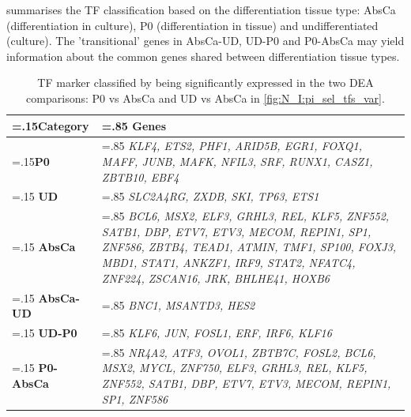  summarises the TF classification based on the differentiation tissue type: AbsCa (differentiation in culture), P0 (differentiation in tissue) and undifferentiated (culture). The 'transitional' genes in AbsCa-UD, UD-P0 and P0-AbsCa may yield information about the common genes shared between differentiation tissue types.

\begin{table}[!htb]
  \centering
  \small
  \begin{tabularx}{\textwidth}{>{\hsize=.15\hsize}X|>{\hsize=.85\hsize}X}
    \toprule
    \textbf{Category} & \textbf{Genes} \\
    \midrule
    \textbf{P0} & \textit{KLF4, ETS2, PHF1, ARID5B, EGR1, FOXQ1, MAFF, JUNB, MAFK, NFIL3, SRF, RUNX1, CASZ1, ZBTB10, EBF4} \\
    \midrule
    \textbf{UD} & \textit{SLC2A4RG, ZXDB, SKI, TP63, ETS1} \\
    \midrule
    \textbf{AbsCa} & \textit{BCL6, MSX2, ELF3, GRHL3, REL, KLF5, ZNF552, SATB1, DBP, ETV7, ETV3, MECOM, REPIN1, SP1, ZNF586, ZBTB4, TEAD1, ATMIN, TMF1, SP100, FOXJ3, MBD1, STAT1, ANKZF1, IRF9, STAT2, NFATC4, ZNF224, ZSCAN16, JRK, BHLHE41, HOXB6} \\
    \midrule
    \textbf{AbsCa-UD} & \textit{BNC1, MSANTD3, HES2} \\
    \midrule
    \textbf{UD-P0} & \textit{KLF6, JUN, FOSL1, ERF, IRF6, KLF16} \\
    \midrule
    \textbf{P0-AbsCa} & \textit{NR4A2, ATF3, OVOL1, ZBTB7C, FOSL2, BCL6, MSX2, MYCL, ZNF750, ELF3, GRHL3, REL, KLF5, ZNF552, SATB1, DBP, ETV7, ETV3, MECOM, REPIN1, SP1, ZNF586} \\
    \bottomrule
  \end{tabularx}
  \caption[Tissue differentiation markers]{TF marker classified by being significantly expressed in the two DEA comparisons: P0 vs AbsCa and UD vs AbsCa in \cref{fig:N_I:pi_sel_tfs_var}.} 
  \label{tab:N_I:markers_diff}
\end{table}

